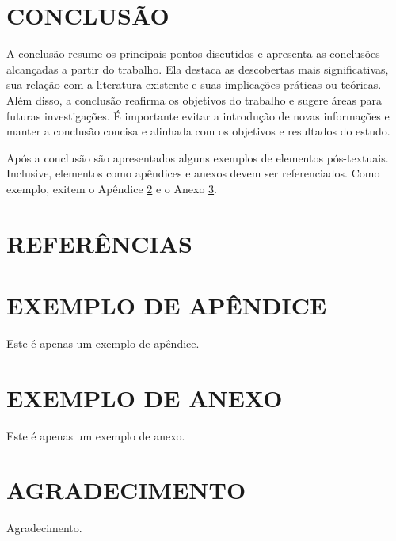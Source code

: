 \documentclass[artigo]{iftex2024}
\begin{document}
\section{CONCLUSÃO}

A conclusão resume os principais pontos discutidos e apresenta as conclusões alcançadas a partir do trabalho.
Ela destaca as descobertas mais significativas, sua relação com a literatura existente e suas implicações práticas ou teóricas.
Além disso, a conclusão reafirma os objetivos do trabalho e sugere áreas para futuras investigações.
É importante evitar a introdução de novas informações e manter a conclusão concisa e alinhada com os objetivos e resultados do estudo.

Após a conclusão são apresentados alguns exemplos de elementos pós-textuais.
Inclusive, elementos como apêndices e anexos devem ser referenciados.
Como exemplo, exitem o Apêndice \ref{ap:exemplo} e o Anexo \ref{an:exemplo}.

\section*{REFERÊNCIAS}

\printbibliography

\appendix

\section{EXEMPLO DE APÊNDICE} \label{ap:exemplo}

Este é apenas um exemplo de apêndice.

\attachment

\section{EXEMPLO DE ANEXO} \label{an:exemplo}

Este é apenas um exemplo de anexo.

\section*{AGRADECIMENTO}

Agradecimento.
\end{document}
